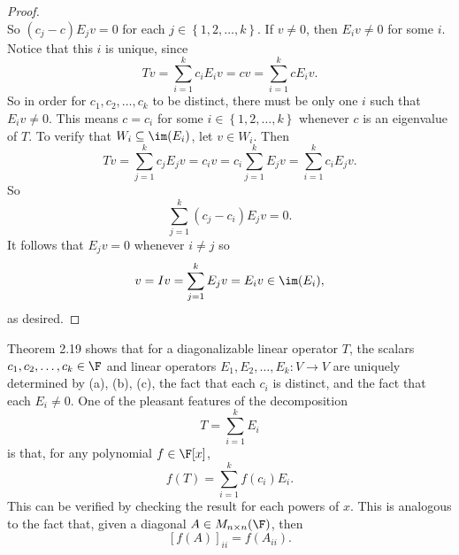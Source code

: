 \documentclass[linearalgebraII]{subfiles}
\begin{document}
\begin{proof}
\begin{equation*}
        \end{equation*}
        So $(c_j-c)E_jv = 0$ for each $j\in \left\lbrace 1, 2, \ldots, k \right\rbrace$. If $v\neq 0$, then $E_iv\neq 0$ for some $i$. Notice that this $i$ is unique, since
        \begin{equation*}
            Tv = \sum^{k}_{i=1} c_iE_iv = cv = \sum^{k}_{i=1} cE_iv.
        \end{equation*}
        So in order for $c_1, c_2, \ldots, c_k$ to be distinct, there must be only one $i$ such that $E_iv\neq 0$. This means $c = c_i$ for some $i\in \left\lbrace 1, 2, \ldots, k \right\rbrace$ whenever $c$ is an eigenvalue of $T$. To verify that $W_i\subseteq \im(E_i)$, let $v\in W_i$. Then
        \begin{equation*}
            Tv = \sum^{k}_{j=1} c_jE_jv = c_iv = c_i \sum^{k}_{j=1} E_jv = \sum^{k}_{i=1} c_iE_jv.
        \end{equation*}
        So
        \begin{equation*}
            \sum^{k}_{j=1} \left( c_j - c_i \right) E_jv = 0. 
        \end{equation*}
        It follows that $E_jv = 0$ whenever $i\neq j$ so
        \begin{equation*}
            v = Iv = \sum^{k}_{j=1} E_jv = E_iv \in \im(E_i),
        \end{equation*}
        as desired.
    \end{proof}

    \begin{remark}
        Theorem 2.19 shows that for a diagonalizable linear operator $T$, the scalars $c_1, c_2, \ldots, c_k\in \F$ and linear operators $E_1, E_2, \ldots, E_k:V\to V$ are uniquely determined by (a), (b), (c), the fact that each $c_i$ is distinct, and the fact that each $E_i\neq 0$. One of the pleasant features of the decomposition
        \begin{equation*}
            T = \sum^{k}_{i=1} E_i
        \end{equation*}
        is that, for any polynomial $f\in \F[x]$,
        \begin{equation*}
            f(T) = \sum^{k}_{i=1} f(c_i)E_i.
        \end{equation*}
        This can be verified by checking the result for each powers of $x$. This is analogous to the fact that, given a diagonal $A\in M_{n\times n}(\F)$, then
        \begin{equation*}
            \left[ f(A) \right] _{ii} = f(A_{ii}).
        \end{equation*}
    \end{remark}
\end{document}
